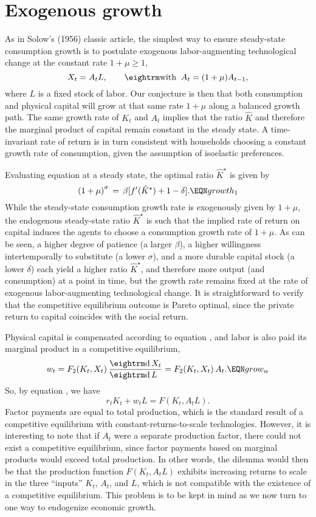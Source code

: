 \section{Exogenous growth}

As in Solow's (1956) classic article,
the simplest way to ensure steady-state consumption growth is to
postulate exogenous labor-augmenting technological change at the constant
rate $1+\mu\geq 1$,
$$
X_t = A_t L, \qquad {\rm with}\;\; A_{t} = (1+\mu) A_{t-1},
$$
where $L$ is a fixed stock of labor.
Our conjecture is then that both consumption and physical capital will
grow at that same rate $1+\mu$ along a balanced growth path. The same
growth rate of $K_t$ and $A_t$ implies
that the ratio $\hat K$ and therefore the marginal product of capital
remain constant in the steady state. A time-invariant rate of return is in
turn consistent with households
choosing a constant growth rate of consumption,
given the assumption of isoelastic preferences.

Evaluating equation
  at a steady state, the optimal ratio $\hat K^{\star}$ is
given by
$$
\left(1+\mu\right)^\sigma \,=\, \beta [f'(\hat K^{\star}) +1 - \delta].
                                                            \EQN growth_1
$$
While the steady-state consumption growth rate is exogenously
given by $1+\mu$, the endogenous steady-state ratio $\hat K^{\star}$
is such that the implied rate of return on capital induces the agents to
choose a consumption growth rate of $1+\mu$. As can be seen,
a higher degree of patience (a larger $\beta$), a higher willingness
intertemporally to substitute (a lower $\sigma$), and a more durable
capital stock (a lower $\delta$) each
yield a higher ratio $\hat K^{\star}$, and
therefore more output (and consumption) at a point in time, but the
growth rate remains fixed at the rate of exogenous labor-augmenting
technological change.
It is straightforward to verify that the competitive equilibrium
outcome is Pareto optimal, since the private return to capital
coincides with the social return.

Physical capital is compensated according to equation , and labor
is also paid its marginal product in a competitive equilibrium,
$$
w_t = F_2(K_t,X_t) \, {{\rm d}\, X_t \over {\rm d}\,L\hfill}
    = F_2(K_t,X_t) \, A_t.                                     \EQN grow_w
$$
So, by equation , we have
$$
r_t K_t + w_t L = F(K_t,A_t L).
$$
Factor payments are equal to total production, which is the
standard result of a competitive equilibrium with
constant-returns-to-scale technologies. However, it is interesting to
note that if $A_t$ were a separate production factor, there could not
exist a competitive equilibrium, since factor payments based on marginal
products would exceed total production. In other words, the dilemma
would then be that the production function
$F(K_t,A_t L)$ exhibits increasing returns to
scale in the three ``inputs'' $K_t$, $A_t$, and $L$, which is not
compatible with the existence of a competitive equilibrium. This
problem is to be kept in mind as we now turn to one
way to endogenize economic growth.

